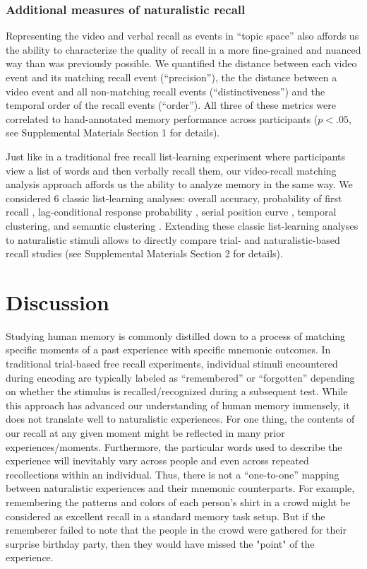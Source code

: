 \documentclass{article}
\begin{document}
\subsubsection*{Additional measures of naturalistic recall}
Representing the video and verbal recall as events in ``topic space'' also affords us the ability to characterize the quality of recall in a more fine-grained and nuanced way than was previously possible. We quantified the distance between each video event and its matching recall event (``precision''), the the distance between a video event and all non-matching recall events (``distinctiveness'') and the temporal order of the recall events (``order''). All three of these metrics were correlated to hand-annotated memory performance across participants ($p<.05$, see Supplemental Materials Section 1 for details).

Just like in a traditional free recall list-learning experiment where participants view a list of words and then verbally recall them, our video-recall matching analysis approach affords us the ability to analyze memory in the same way. We considered 6 classic list-learning analyses: overall accuracy, probability of first recall \citep{Hoga75, HowaKaha99, Lami99}, lag-conditional response probability \citep{Kaha96, HowaKaha99}, serial position curve \citep{Murd62a}, temporal clustering, and semantic clustering \citep{HowaKaha02, PolyEtal09}. Extending these classic list-learning analyses to naturalistic stimuli allows to directly compare trial- and naturalistic-based recall studies (see Supplemental Materials Section 2 for details).

\section*{Discussion}
\label{sec:discussion}
Studying human memory is commonly distilled down to a process of matching specific moments of a past experience with specific mnemonic outcomes.  In traditional trial-based free recall experiments, individual stimuli encountered during encoding are typically labeled as ``remembered'' or ``forgotten'' depending on whether the stimulus is recalled/recognized during a subsequent test. While this approach has advanced our understanding of human memory immensely, it does not translate well to naturalistic experiences. For one thing, the contents of our recall at any given moment might be reflected in many prior experiences/moments. Furthermore, the particular words used to describe the experience will inevitably vary across people and even across repeated recollections within an individual. Thus, there is not a ``one-to-one'' mapping between naturalistic experiences and their mnemonic counterparts. For example, remembering the patterns and colors of each person's shirt in a crowd might be considered as excellent recall in a standard memory task setup. But if the rememberer failed to note that the people in the crowd were gathered for their surprise birthday party, then they would have missed the "point" of the experience.
\end{document}
